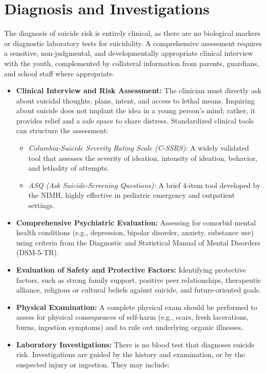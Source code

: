 \section*{Diagnosis and Investigations}
The diagnosis of suicide risk is entirely clinical, as there are no biological markers or diagnostic laboratory tests for suicidality. A comprehensive assessment requires a sensitive, non-judgmental, and developmentally appropriate clinical interview with the youth, complemented by collateral information from parents, guardians, and school staff where appropriate.
\begin{itemize}
    \item \textbf{Clinical Interview and Risk Assessment:} The clinician must directly ask about suicidal thoughts, plans, intent, and access to lethal means. Inquiring about suicide does not implant the idea in a young person's mind; rather, it provides relief and a safe space to share distress. Standardized clinical tools can structure the assessment:
    \begin{itemize}
        \item \textit{Columbia-Suicide Severity Rating Scale (C-SSRS):} A widely validated tool that assesses the severity of ideation, intensity of ideation, behavior, and lethality of attempts.
        \item \textit{ASQ (Ask Suicide-Screening Questions):} A brief 4-item tool developed by the NIMH, highly effective in pediatric emergency and outpatient settings.
    \end{itemize}
    \item \textbf{Comprehensive Psychiatric Evaluation:} Assessing for comorbid mental health conditions (e.g., depression, bipolar disorder, anxiety, substance use) using criteria from the Diagnostic and Statistical Manual of Mental Disorders (DSM-5-TR).
    \item \textbf{Evaluation of Safety and Protective Factors:} Identifying protective factors, such as strong family support, positive peer relationships, therapeutic alliance, religious or cultural beliefs against suicide, and future-oriented goals.
    \item \textbf{Physical Examination:} A complete physical exam should be performed to assess for physical consequences of self-harm (e.g., scars, fresh lacerations, burns, ingestion symptoms) and to rule out underlying organic illnesses.
    \item \textbf{Laboratory Investigations:} There is no blood test that diagnoses suicide risk. Investigations are guided by the history and examination, or by the suspected injury or ingestion. They may include:

\end{itemize}
